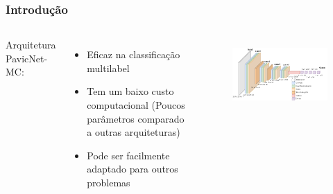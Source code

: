 \documentclass[aspectratio=169]{beamer}
\begin{document}


\begin{frame}
    \frametitle{Introdução}
    \begin{columns}


        Arquitetura PavicNet-MC:
        \begin{itemize}
            \item Eficaz na classificação multilabel
            \item Tem um baixo custo computacional (Poucos parâmetros comparado a outras arquiteturas)
            \item Pode ser facilmente adaptado para outros problemas
        \end{itemize}

        \begin{figure}
            \centering
            \includegraphics[scale=0.5]{img/pavicnet.png}
            \label{fig:enter-label}
        \end{figure}


    \end{columns}
\end{frame}



\end{document}
